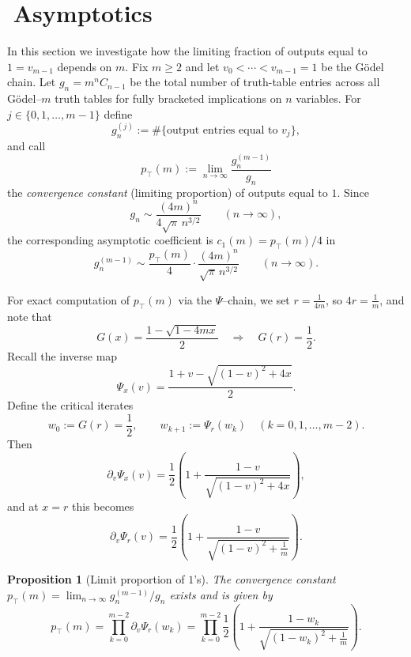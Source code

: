 \documentclass[11pt]{article}
\newtheorem{proposition}{Proposition}
\newcommand{\ptop}{p_{\top}}
\begin{document}
\section{ $\;$Asymptotics}


In this section we investigate how the limiting fraction of outputs equal to \(1=v_{m-1}\)
depends on \(m\). Fix \(m\ge2\) and let \(v_0<\cdots<v_{m-1}=1\) be the Gödel chain.  Let
\(g_n=m^nC_{n-1}\) be the total number of truth-table entries across all Gödel--\(m\) truth
tables for fully bracketed implications on \(n\) variables.  For \(j\in\{0,1,\dots,m-1\}\)
define
\[
g_n^{(j)}:=\#\{\text{output entries equal to }v_j\},
\]
and call
\[
\ptop(m):=\lim_{n\to\infty}\frac{g_n^{(m-1)}}{g_n}
\]
the \emph{convergence constant} (limiting proportion) of outputs equal to \(1\).
Since
\[
g_n\sim \frac{(4m)^n}{4\sqrt{\pi}\,n^{3/2}}\qquad (n\to\infty),
\]
the corresponding asymptotic coefficient is \(c_1(m)=\ptop(m)/4\) in
\[
g_n^{(m-1)}\sim \frac{\ptop(m)}{4}\cdot \frac{(4m)^n}{\sqrt{\pi}\,n^{3/2}}
\qquad (n\to\infty).
\]

\medskip

\noindent
For exact computation of \(\ptop(m)\) via the \(\Psi\)--chain, we set \(r=\frac{1}{4m}\), so \(4r=\frac{1}{m}\), and note that
\[
G(x)=\frac{1-\sqrt{1-4mx}}{2}
\quad\Longrightarrow\quad
G(r)=\frac12.
\]
Recall the inverse map
\[
\Psi_x(v)=\frac{1+v-\sqrt{(1-v)^2+4x}}{2}.
\]
Define the critical iterates
\[
w_0:=G(r)=\frac12,\qquad
w_{k+1}:=\Psi_r(w_k)\quad (k=0,1,\dots,m-2).
\]
Then
\[
\partial_v\Psi_x(v)=\frac12\left(1+\frac{1-v}{\sqrt{(1-v)^2+4x}}\right),
\]
and at \(x=r\) this becomes
\[
\partial_v\Psi_r(v)=\frac12\left(1+\frac{1-v}{\sqrt{(1-v)^2+\frac{1}{m}}}\right).
\]

\begin{proposition}[Limit proportion of $1$'s]\label{prop:p1m-product}
The convergence constant \(\ptop(m)=\lim_{n\to\infty} g_n^{(m-1)}/g_n\) exists and is given by
\[
\boxed{\;
\ptop(m)=\prod_{k=0}^{m-2}\partial_v\Psi_r(w_k)
=\prod_{k=0}^{m-2}
\frac12\left(1+\frac{1-w_k}{\sqrt{(1-w_k)^2+\frac{1}{m}}}\right).
\;}
\]
\end{proposition}
\end{document}
